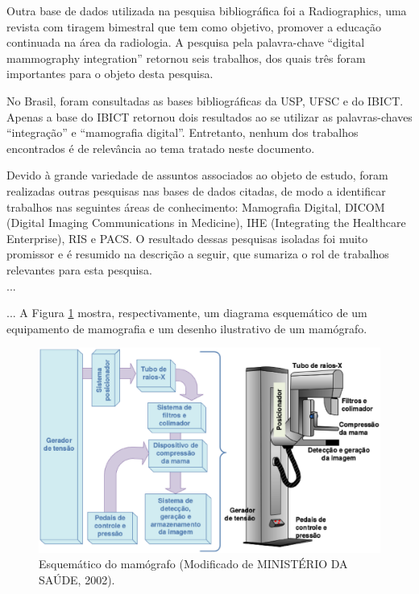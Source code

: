 Outra base de dados utilizada na pesquisa bibliográfica foi a Radiographics, uma
revista com tiragem bimestral que tem como objetivo, promover a educação continuada na
área da radiologia. A pesquisa pela palavra-chave “digital mammography integration”
retornou seis trabalhos, dos quais três foram importantes para o objeto desta pesquisa.

No Brasil, foram consultadas as bases bibliográficas da USP, UFSC e do IBICT.
Apenas a base do IBICT retornou dois resultados ao se utilizar as palavras-chaves
“integração” e “mamografia digital”. Entretanto, nenhum dos trabalhos encontrados é de
relevância ao tema tratado neste documento.

Devido à grande variedade de assuntos associados ao objeto de estudo, foram
realizadas outras pesquisas nas bases de dados citadas, de modo a identificar trabalhos nas
seguintes áreas de conhecimento: Mamografia Digital, DICOM (Digital Imaging
Communications in Medicine), IHE (Integrating the Healthcare Enterprise), RIS e PACS.
O resultado dessas pesquisas isoladas foi muito promissor e é resumido na descrição a
seguir, que sumariza o rol de trabalhos relevantes para esta pesquisa.\\
...

...
A Figura \ref{esquematico} mostra, respectivamente, um diagrama esquemático de um equipamento de
mamografia e um desenho ilustrativo de um mamógrafo.

\begin{figure}[ht]
 \centering
 \includegraphics[width=15 cm]{figuras/fig1.eps}
 \caption{Esquemático do mamógrafo (Modificado de MINISTÉRIO DA SAÚDE, 2002).}
 \label{esquematico}
\end{figure}





